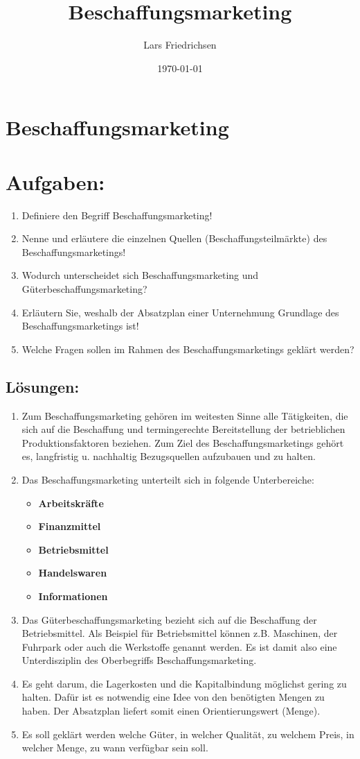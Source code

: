 \documentclass[a4paper,11pt]{scrartcl}	%
\title{Beschaffungsmarketing}
\author{Lars Friedrichsen}
\date{\today}
\begin{document}
\section{Beschaffungsmarketing}


\section{Aufgaben:}

	\begin{enumerate}
		\item Definiere den Begriff Beschaffungsmarketing!
		\item Nenne und erläutere die einzelnen Quellen (Beschaffungsteilmärkte) des Beschaffungsmarketings!
		\item Wodurch unterscheidet sich Beschaffungsmarketing und Güterbeschaffungsmarketing?
		\item Erläutern Sie, weshalb der Absatzplan einer Unternehmung Grundlage des Beschaffungsmarketings ist!
		\item Welche Fragen sollen im Rahmen des Beschaffungsmarketings geklärt werden?
	\end{enumerate}
	
	\subsection{Lösungen:}
	
		\begin{enumerate}
			\item Zum Beschaffungsmarketing gehören im weitesten Sinne alle Tätigkeiten, die sich auf die Beschaffung
			und termingerechte Bereitstellung der betrieblichen Produktionsfaktoren beziehen.
			Zum Ziel des Beschaffungsmarketings gehört es, langfristig u. nachhaltig Bezugsquellen aufzubauen und zu halten.
			\item Das Beschaffungsmarketing unterteilt sich in folgende Unterbereiche:
				\begin{itemize}
					\item \textbf{Arbeitskräfte}
					\item \textbf{Finanzmittel} 
					\item \textbf{Betriebsmittel} 
					\item \textbf{Handelswaren}
					\item \textbf{Informationen}
				\end{itemize}				 
			\item Das Güterbeschaffungsmarketing bezieht sich auf die Beschaffung der Betriebsmittel. 
			Als Beispiel für Betriebsmittel können z.B. Maschinen, der Fuhrpark oder auch die Werkstoffe
			genannt werden. Es ist damit also eine Unterdisziplin des Oberbegriffs Beschaffungsmarketing.			
			\item Es geht darum, die Lagerkosten und die Kapitalbindung möglichst gering zu halten.  
			Dafür ist es notwendig eine Idee von den benötigten Mengen zu haben.
			Der Absatzplan liefert somit einen Orientierungswert (Menge).
			\item Es soll geklärt werden welche Güter, in welcher Qualität, zu welchem Preis, in welcher Menge,
			zu wann verfügbar sein soll.
		\end{enumerate}
	
	
\end{document}
